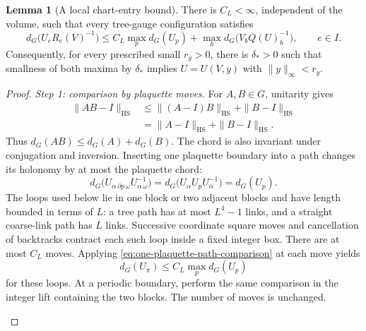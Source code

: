 \documentclass[10pt,reqno]{amsart}
\theoremstyle{definition}
\newtheorem{lemma}[definition]{Lemma}
\theoremstyle{remark}
\numberwithin{equation}{section}
\numberwithin{figure}{section}
\begin{document}
\begin{lemma}[A local chart-entry bound]\label{lem:straight-chart-entry}
There is $C_L<\infty$, independent of the volume, such that every
tree-gauge configuration satisfies
\begin{equation}\label{eq:straight-chart-entry-bound}
d_G\bigl(U_eR_e(V)^{-1}\bigr)
\le C_L\max_p d_G(U_p)
+\max_b d_G\bigl(V_bQ(U)_b^{-1}\bigr),\qquad e\in I.
\end{equation}
Consequently, for every prescribed small $r_y>0$, there is $\delta_*>0$
such that smallness of both maxima by $\delta_*$ implies
$U=U(V,y)$ with $\|y\|_\infty<r_y$.
\end{lemma}
\begin{proof}
\emph{Step 1: comparison by plaquette moves.}
For $A,B\in G$, unitarity gives
\begin{equation}\label{eq:chord-product-inequality}
\begin{aligned}
\|AB-I\|_{\mathrm{HS}}
&\le\|(A-I)B\|_{\mathrm{HS}}+\|B-I\|_{\mathrm{HS}}\\
&=\|A-I\|_{\mathrm{HS}}+\|B-I\|_{\mathrm{HS}}.
\end{aligned}
\end{equation}
Thus $d_G(AB)\le d_G(A)+d_G(B)$. The chord is also invariant under
conjugation and inversion. Inserting one plaquette boundary into a path
changes its holonomy by at most the plaquette chord:
\begin{equation}\label{eq:one-plaquette-path-comparison}
d_G\bigl(U_{\alpha\,\partial p\,\omega}
U_{\alpha\,\omega}^{-1}\bigr)
=d_G\bigl(U_\alpha U_pU_\alpha^{-1}\bigr)=d_G(U_p).
\end{equation}
The loops used below lie in one block or two adjacent blocks and have
length bounded in terms of $L$: a tree path has at most $L^4-1$ links,
and a straight coarse-link path has $L$ links. Successive coordinate
square moves and cancellation of backtracks contract each such loop
inside a fixed integer box. There are at most $C_L$ moves. Applying
\eqref{eq:one-plaquette-path-comparison} at each move yields
\begin{equation}\label{eq:bounded-loop-plaquette-bound}
d_G(U_\pi)\le C_L\max_p d_G(U_p)
\end{equation}
for these loops. At a periodic boundary, perform the same comparison in
the integer lift containing the two blocks. The number of moves is unchanged.
\begin{figure}[htbp]
\centering
\begin{minipage}[c]{.43\linewidth}
\centering

\end{minipage}
\end{figure}
\end{proof}
\end{document}
